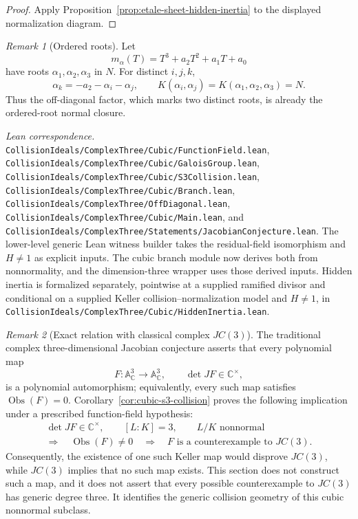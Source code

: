 \documentclass[11pt]{article}
\theoremstyle{remark}
\newtheorem*{remark}{Remark}
\theoremstyle{definition}
\newcommand{\A}{\mathbb A}
\newcommand{\C}{\mathbb C}
\newcommand{\Obs}{\operatorname{Obs}}
\newcommand{\leanpath}[1]{\texttt{\nolinkurl{#1}}}
\newenvironment{leanfiles}
  {\par\medskip\begingroup\footnotesize\raggedright\noindent
   \textit{Lean correspondence.}\ }
  {\par\endgroup\medskip}
\begin{document}
\begin{proof}
Apply Proposition~\ref{prop:etale-sheet-hidden-inertia} to the displayed
normalization diagram.
\end{proof}

\begin{remark}[Ordered roots]
Let
\[
  m_\alpha(T)=T^3+a_2T^2+a_1T+a_0
\]
have roots \(\alpha_1,\alpha_2,\alpha_3\) in \(N\).  For distinct
\(i,j,k\),
\[
  \alpha_k=-a_2-\alpha_i-\alpha_j,
  \qquad
  K(\alpha_i,\alpha_j)
  =
  K(\alpha_1,\alpha_2,\alpha_3)
  =
  N.
\]
Thus the off-diagonal factor, which marks two distinct roots, is already
the ordered-root normal closure.
\end{remark}

\begin{leanfiles}
\leanpath{CollisionIdeals/ComplexThree/Cubic/FunctionField.lean},
\leanpath{CollisionIdeals/ComplexThree/Cubic/GaloisGroup.lean},
\leanpath{CollisionIdeals/ComplexThree/Cubic/S3Collision.lean},
\leanpath{CollisionIdeals/ComplexThree/Cubic/Branch.lean},
\leanpath{CollisionIdeals/ComplexThree/OffDiagonal.lean},
\leanpath{CollisionIdeals/ComplexThree/Cubic/Main.lean}, and
\leanpath{CollisionIdeals/ComplexThree/Statements/JacobianConjecture.lean}.  The
lower-level generic Lean witness builder takes the residual-field
isomorphism and \(H\neq1\) as explicit inputs.  The cubic branch module now
derives both from nonnormality, and the dimension-three wrapper uses those
derived inputs.  Hidden inertia is formalized separately, pointwise at a
supplied ramified divisor and conditional on a supplied Keller
collision--normalization model and \(H\neq1\), in
\leanpath{CollisionIdeals/ComplexThree/Cubic/HiddenInertia.lean}.
\end{leanfiles}

\begin{remark}[Exact relation with classical complex \(JC(3)\)]
\label{rem:exact-relation-jc3}
The traditional complex three-dimensional Jacobian conjecture asserts that
every polynomial map
\[
  F\colon\A^3_{\C}\longrightarrow\A^3_{\C},
  \qquad
  \det JF\in\C^\times,
\]
is a polynomial automorphism; equivalently, every such map satisfies
\(\Obs(F)=0\).  Corollary~\ref{cor:cubic-s3-collision} proves the following
implication under a prescribed function-field hypothesis:
\[
  \begin{gathered}
    \det JF\in\C^\times,\qquad [L:K]=3,\qquad
    L/K\text{ nonnormal}\\
    \Longrightarrow\quad \Obs(F)\neq0
    \quad\Longrightarrow\quad
    F\text{ is a counterexample to }JC(3).
  \end{gathered}
\]
Consequently, the existence of one such Keller map would disprove
\(JC(3)\), while \(JC(3)\) implies that no such map exists.  This section
does not construct such a map, and it does not assert that every possible
counterexample to \(JC(3)\) has generic degree three.  It identifies the
generic collision geometry of this cubic nonnormal subclass.
\end{remark}
\end{document}
